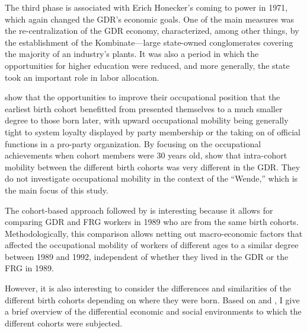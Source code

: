 \begin{Article}
\begin{refsection}[Spitz]
The third phase is associated with Erich Honecker's coming to power in 1971, which again changed the GDR's economic goals. One of the main measures was the re-centralization of the GDR economy, characterized, among other things, by the establishment of the Kombinate—large state-owned conglomerates covering the majority of an industry's plants. It was also a period in which the opportunities for higher education were reduced, and more generally, the state took an important role in labor allocation.

\cite{HuininkSolga1994} show that the opportunities to improve their occupational position that the earliest birth cohort benefitted from presented themselves to a much smaller degree to those born later, with upward occupational mobility being generally tight to system loyalty displayed by party membership or the taking on of official functions in a pro-party organization. By focusing on the occupational achievements when cohort members were 30 years old, \cite{HuininkSolga1994} show that intra-cohort mobility between the different birth cohorts was very different in the GDR. They do not investigate occupational mobility in the context of the ``Wende,'' which is the main focus of this study.

The cohort-based approach followed by \cite{HuininkSolga1994} is interesting because it allows for comparing GDR and FRG workers in 1989 who are from the same birth cohorts. Methodologically, this comparison allows netting out macro-economic factors that affected the occupational mobility of workers of different ages to a similar degree between 1989 and 1992, independent of whether they lived in the GDR or the FRG in 1989. 

However, it is also interesting to consider the differences and similarities of the different birth cohorts depending on where they were born. Based on \cite{Ritschl1995} and \cite{EichengreenRitschl2009}, I give a brief overview of the differential economic and social environments to which the different cohorts were subjected. 


\end{refsection}
\end{Article}
